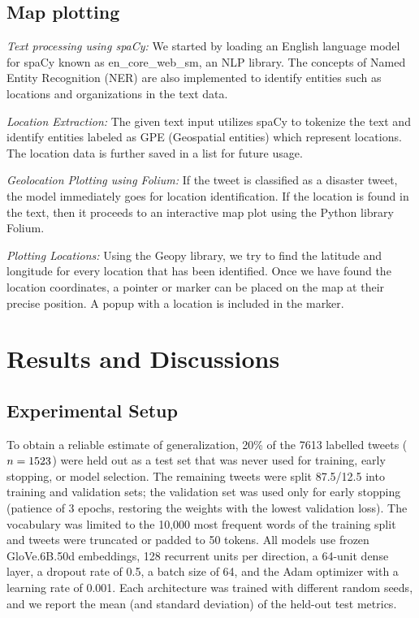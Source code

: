 \documentclass[conference]{IEEEtran}
\begin{document}
\subsection{Map plotting}
\textit{Text processing using spaCy:} We started by loading an English language model for spaCy known as en\_core\_web\_sm, an NLP library. The concepts of Named Entity Recognition (NER) are also implemented to identify entities such as locations and organizations in the text data.

\textit{Location Extraction:} The given text input utilizes spaCy to tokenize the text and identify entities labeled as GPE (Geospatial entities) which represent locations. The location data is further saved in a list for future usage.

\textit{Geolocation Plotting using Folium:} If the tweet is classified as a disaster tweet, the model immediately goes for location identification. If the location is found in the text, then it proceeds to an interactive map plot using the Python library Folium.

\textit{Plotting Locations:} Using the Geopy library, we try to find the latitude and longitude for every location that has been identified. Once we have found the location coordinates, a pointer or marker can be placed on the map at their precise position. A popup with a location is included in the marker.

\section{Results and Discussions}

\subsection{Experimental Setup}
To obtain a reliable estimate of generalization, 20\% of the 7613 labelled tweets ($n=1523$) were held out as a test set that was never used for training, early stopping, or model selection. The remaining tweets were split 87.5/12.5 into training and validation sets; the validation set was used only for early stopping (patience of 3 epochs, restoring the weights with the lowest validation loss). The vocabulary was limited to the 10{,}000 most frequent words of the training split and tweets were truncated or padded to 50 tokens. All models use frozen GloVe.6B.50d embeddings, 128 recurrent units per direction, a 64-unit dense layer, a dropout rate of 0.5, a batch size of 64, and the Adam optimizer with a learning rate of 0.001. Each architecture was trained with \nseedsBilstm{} different random seeds, and we report the mean (and standard deviation) of the held-out test metrics.
\end{document}
